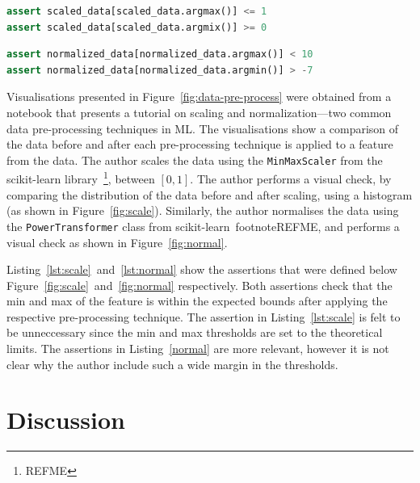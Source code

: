 \documentclass[conference]{IEEEtran}
\begin{document}
\begin{minipage}{0.45\textwidth}
  \begin{lstlisting}[language=Python]
assert scaled_data[scaled_data.argmax()] <= 1
assert scaled_data[scaled_data.argmix()] >= 0
  \end{lstlisting}
  \label{lst:scale}
\end{minipage}
\hfill
\begin{minipage}{0.45\textwidth}
  \begin{lstlisting}[language=Python]
assert normalized_data[normalized_data.argmax()] < 10
assert normalized_data[normalized_data.argmin()] > -7
  \end{lstlisting}
  \label{lst:normal}
\end{minipage}

Visualisations presented in Figure~\ref{fig:data-pre-process} were obtained from a notebook that presents a tutorial on scaling and normalization---two common data pre-processing techniques in ML. The visualisations show a comparison of the data before and after each pre-processing technique is applied to a feature from the data. The author scales the data using the \texttt{MinMaxScaler} from the scikit-learn library~\footnote{REFME}, between $[0, 1]$. The author performs a visual check, by comparing the distribution of the data before and after scaling, using a histogram (as shown in Figure~\ref{fig:scale}). Similarly, the author normalises the data using the \texttt{PowerTransformer} class from scikit-learn~footnote{REFME}, and performs a visual check as shown in Figure~\ref{fig:normal}.

Listing~\ref{lst:scale}~and~\ref{lst:normal} show the assertions that were defined below Figure~\ref{fig:scale}~and~\ref{fig:normal} respectively. Both assertions check that the min and max of the feature is within the expected bounds after applying the respective pre-processing technique. The assertion in Listing~\ref{lst:scale} is felt to be unneccessary since the min and max thresholds are set to the theoretical limits. The assertions in Listing~\ref{normal} are more relevant, however it is not clear why the author include such a wide margin in the thresholds.

\section{Discussion}\label{sec:discuss}
\end{document}
